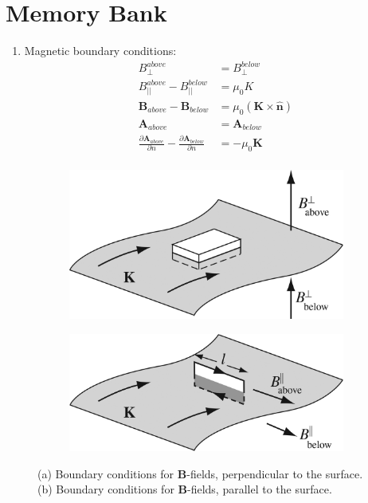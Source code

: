 \documentclass[12pt]{article}
\begin{document}
\maketitle
\small
\section{Memory Bank}
\begin{enumerate}
\item Magnetic boundary conditions:
\begin{align}
B_{\perp}^{above} &= B_{\perp}^{below} \label{eq:1} \\
B_{||}^{above} - B_{||}^{below} &= \mu_0 K \label{eq:2} \\
\mathbf{B}_{above} - \mathbf{B}_{below} &= \mu_0 \left(\mathbf{K} \times \hat{\mathbf{n}}\right) \label{eq:3} \\
\mathbf{A}_{above} &= \mathbf{A}_{below} \\
\frac{\partial\mathbf{A}_{above}}{\partial n} - \frac{\partial\mathbf{A}_{below}}{\partial n} &= -\mu_0 \mathbf{K} \\
\end{align}
\end{enumerate}

\begin{figure}[ht]
\centering
\begin{subfigure}{0.3\textwidth}
\includegraphics[width=\textwidth]{figures/5_49.jpg}
\caption{ }
\end{subfigure}
\hspace{0.5cm}
\begin{subfigure}{0.3\textwidth}
\includegraphics[width=\textwidth]{figures/5_50.jpg}
\caption{ }
\end{subfigure}
\caption{\label{fig:1} (a) Boundary conditions for $\mathbf{B}$-fields, perpendicular to the surface. (b) Boundary conditions for $\mathbf{B}$-fields, parallel to the surface.}
\end{figure}
\end{document}
